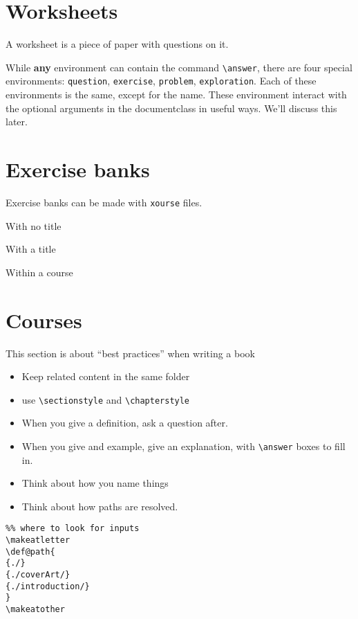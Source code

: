 \documentclass{ximera}
\begin{document}
\section{Worksheets}

A worksheet is a piece of paper with questions on it.

While \textbf{any} environment can contain the command \verb|\answer|,
there are four special environments: \verb|question|, \verb|exercise|,
\verb|problem|, \verb|exploration|. Each of these environments is the
same, except for the name. These environment interact with the
optional arguments in the documentclass in useful ways. We'll discuss
this later.

\section{Exercise banks}

Exercise banks can be made with \verb!xourse! files.

With no title

With a title

Within a course

    \section{Courses}

    This section is about ``best practices'' when writing a book
    \begin{itemize}
      \item Keep related content in the same folder
      \item use \texttt{\textbackslash sectionstyle} and
            \texttt{\textbackslash chapterstyle}
      \item When you give a definition, ask a question after.
      \item When you give and example, give an explanation, with
            \texttt{\textbackslash answer} boxes to fill in.
      \item Think about how you name things
      \item Think about how paths are resolved.
    \end{itemize}

    \begin{verbatim}
%% where to look for inputs
\makeatletter
\def@path{
{./}
{./coverArt/}
{./introduction/}
}
\makeatother
\end{verbatim}
    \pdfOnly{\end{multicols}}
\end{document}
